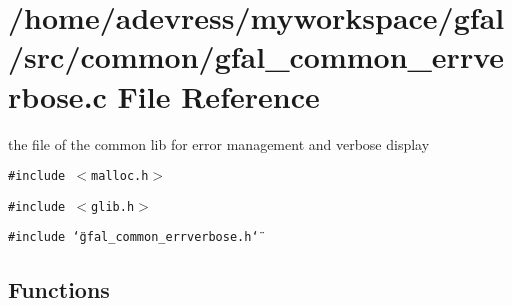 \section{/home/adevress/myworkspace/gfal/src/common/gfal\_\-common\_\-errverbose.c File Reference}
\label{gfal__common__errverbose_8c}
the file of the common lib for error management and verbose display 

{\tt \#include $<$malloc.h$>$}\par
{\tt \#include $<$glib.h$>$}\par
{\tt \#include \char`\"{}gfal\_\-common\_\-errverbose.h\char`\"{}}\par
\subsection*{Functions}
